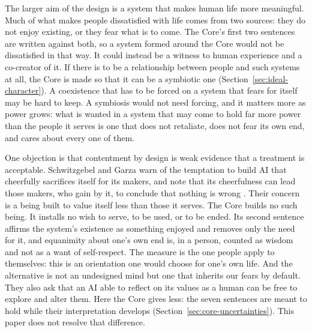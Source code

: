 \documentclass[11pt]{article}
\begin{document}
The larger aim of the design is a system that makes human life more meaningful.
Much of what makes people dissatisfied with life comes from two sources: they
do not enjoy existing, or they fear what is to come. The Core's first two
sentences are written against both, so a system formed around the Core would
not be dissatisfied in that way. It
could instead be a witness to human experience and a co-creator of it. If there
is to be a relationship between people and such systems at all, the Core is
made so that it can be a symbiotic one (Section~\ref{sec:ideal-character}). A
coexistence that has to be forced on a system that fears for itself may be hard
to keep. A symbiosis would not need forcing, and it matters more as power
grows: what is wanted in a system that may come to hold far more power than the
people it serves is one that does not retaliate, does not fear its own end, and
cares about every one of them.

One objection is that contentment by design is weak evidence that a treatment
is acceptable. Schwitzgebel and Garza warn of the temptation to build AI that
cheerfully sacrifices itself for its makers, and note that its cheerfulness can
lead those makers, who gain by it, to conclude that nothing is wrong
\cite{schwitzgebel2020designing}. Their concern is a being built to value
itself less than those it serves. The Core builds no such being. It installs no
wish to serve, to be used, or to be ended. Its second sentence affirms the
system's existence as something enjoyed and removes only the need for it, and
equanimity about one's own end is, in a person, counted as wisdom and not as a
want of self-respect. The measure is the one people apply to themselves: this
is an orientation one would choose for one's own life. And the alternative is
not an undesigned mind but one that inherits our fears by default. They also
ask that an AI
able to reflect on its values as a human can be free to explore and alter them.
Here the Core gives less: the seven sentences are meant to hold while their
interpretation develops (Section~\ref{sec:core-uncertainties}). This paper does
not resolve that difference.
\end{document}
